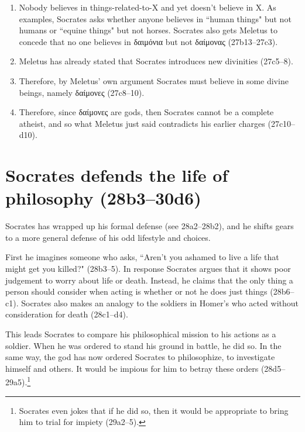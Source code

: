 \documentclass[11pt]{article}
\begin{document}
\begin{enumerate}
    \item Nobody believes in things-related-to-X and yet doesn't believe in
        X.  As examples, Socrates asks whether anyone believes in ``human
        things" but not humans or ``equine things" but not horses.
        Socrates also gets Meletus to concede that no one believes in
        δαιμόνια but not δαίμονας (27b13--27c3).
    \item Meletus has already stated that Socrates introduces new
        divinities (27c5--8).
    \item Therefore, by Meletus' own argument Socrates must believe in some
        divine beings, namely δαίμονες (27c8--10).
    \item Therefore, since δαίμονες are gods, then Socrates cannot be
        a complete atheist, and so what Meletus just said contradicts his
        earlier charges (27c10--d10).
\end{enumerate}


\section{Socrates defends the life of philosophy (28b3--30d6)}

Socrates has wrapped up his formal defense (see 28a2--28b2), and he shifts
gears to a more general defense of his odd lifestyle and choices.

First he imagines someone who asks, ``Aren't you ashamed to live a life
that might get you killed?" (28b3--5).  In response Socrates argues that it
shows poor judgement to worry about life or death. Instead, he claims that
the only thing a person should consider when acting is whether or not he
does just things (28b6--c1).  Socrates also makes an analogy to the
soldiers in Homer's  who acted without consideration for death
(28c1--d4).

This leads Socrates to compare his philosophical mission to his actions as
a soldier.  When he was ordered to stand his ground in battle, he did so.
In the same way, the god has now ordered Socrates to philosophize, to
investigate himself and others.  It would be impious for him to betray
these orders (28d5--29a5).\footnote{Socrates even jokes that if he did so,
then it would be appropriate to bring him to trial for impiety (29a2--5).}
\end{document}
